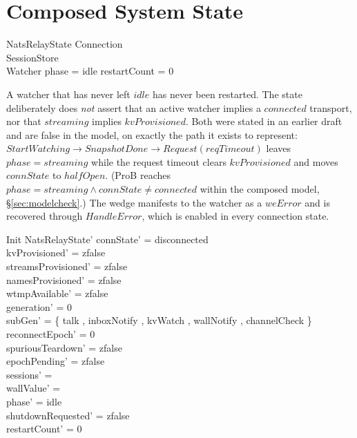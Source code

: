 \documentclass[a4paper,10pt,fleqn]{article}
\begin{document}
\section{Composed System State}
\label{sec:composed}

\begin{schema}{NatsRelayState}
  Connection \\
  SessionStore \\
  Watcher
  \where
  phase = idle \implies restartCount = 0
\end{schema}

A watcher that has never left $idle$ has never been restarted.  The
state deliberately does \emph{not} assert that an active watcher implies
a $connected$ transport, nor that $streaming$ implies $kvProvisioned$.
Both were stated in an earlier draft and are false in the model, on
exactly the path it exists to represent: $StartWatching \to SnapshotDone
\to Request(reqTimeout)$ leaves $phase = streaming$ while the request
timeout clears $kvProvisioned$ and moves $connState$ to $halfOpen$.
(ProB reaches $phase = streaming \land connState \neq connected$
within the composed model, \S\ref{sec:modelcheck}.)  The wedge manifests
to the watcher as a $weError$ and is recovered through $HandleError$,
which is enabled in every connection state.

\begin{schema}{Init}
  NatsRelayState'
  \where
  connState' = disconnected \\
  kvProvisioned' = zfalse \\
  streamsProvisioned' = zfalse \\
  namesProvisioned' = zfalse \\
  wtmpAvailable' = zfalse \\
  generation' = 0 \\
  subGen' = \{ talk , inboxNotify , kvWatch , wallNotify , channelCheck  \} \\
  reconnectEpoch' = 0 \\
  spuriousTeardown' = zfalse \\
  epochPending' = zfalse \\
  sessions' = \emptyset \\
  wallValue' = \emptyset \\
  phase' = idle \\
  shutdownRequested' = zfalse \\
  restartCount' = 0
\end{schema}
\end{document}
